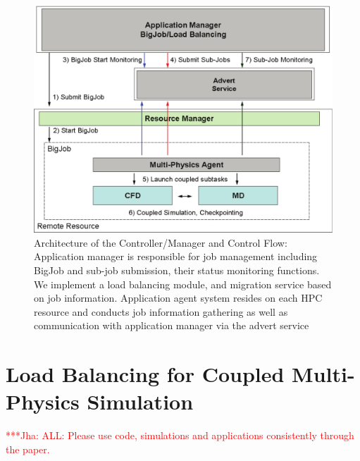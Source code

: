 \documentclass[conference,final]{IEEEtran}
\newcommand{\jhanote}[1]{ {\textcolor{red} { ***Jha: #1 }}}
\newcommand{\jhanote}[1]{}
\begin{document}
\begin{figure}
\centering
\includegraphics[scale=0.38]{Structure_of_BigJob}
\caption{\small Architecture of the Controller/Manager and Control
  Flow: Application manager is responsible for job management
  including BigJob and sub-job submission, their status monitoring
  functions. We implement a load balancing module, and migration
  service based on job information. Application agent system resides
  on each HPC resource and conducts job information gathering as well
  as communication with application manager via the advert service}
\label{Fig:BigJob_Structure}
\end{figure}



\section{Load Balancing for Coupled Multi-Physics Simulation}

\jhanote{ALL: Please use code, simulations and applications
  consistently through the paper.}

\end{document}
